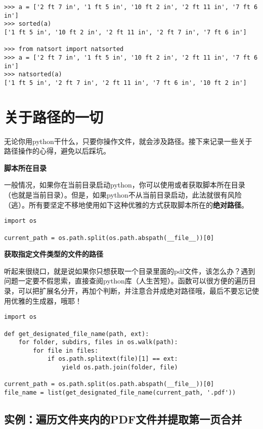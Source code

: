 \begin{verbatim}
>>> a = ['2 ft 7 in', '1 ft 5 in', '10 ft 2 in', '2 ft 11 in', '7 ft 6 in']
>>> sorted(a)
['1 ft 5 in', '10 ft 2 in', '2 ft 11 in', '2 ft 7 in', '7 ft 6 in']

>>> from natsort import natsorted
>>> a = ['2 ft 7 in', '1 ft 5 in', '10 ft 2 in', '2 ft 11 in', '7 ft 6 in']
>>> natsorted(a)
['1 ft 5 in', '2 ft 7 in', '2 ft 11 in', '7 ft 6 in', '10 ft 2 in']
\end{verbatim}

\section{关于路径的一切}

无论你用python干什么，只要你操作文件，就会涉及路径。接下来记录一些关于路径操作的心得，避免以后踩坑。

\textbf{脚本所在目录}

一般情况，如果你在当前目录启动python，你可以使用或者获取脚本所在目录（也就是当前目录）。但是，如果python不从当前目录启动，此法就很有风险（逃）。所有要坚定不移地使用如下这种优雅的方式获取脚本所在的\textbf{绝对路径}。

\begin{verbatim}
import os

current_path = os.path.split(os.path.abspath(__file__))[0]
\end{verbatim}

\textbf{获取指定文件类型的文件的路径}

听起来很绕口，就是说如果你只想获取一个目录里面的pdf文件，该怎么办？遇到问题一定要不假思索，直接查阅python库（人生苦短）。函数可以很方便的遍历目录，可以把扩展名分开，再加个判断，并注意合并成绝对路径哦，最后不要忘记使用优雅的生成器，哦耶！

\begin{verbatim}
import os

def get_designated_file_name(path, ext):
    for folder, subdirs, files in os.walk(path):
        for file in files:
            if os.path.splitext(file)[1] == ext:
                yield os.path.join(folder, file)

current_path = os.path.split(os.path.abspath(__file__))[0]
file_name = list(get_designated_file_name(current_path, '.pdf'))
\end{verbatim}

\subsection{实例：遍历文件夹内的PDF文件并提取第一页合并}

